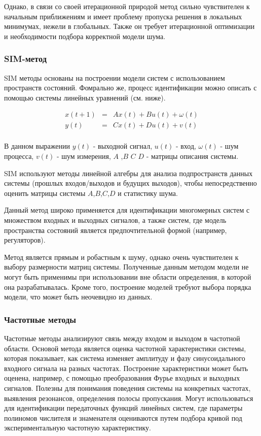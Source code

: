 Однако, в связи со своей итерационной природой метод сильно чувствителен к
начальным приближениям и имеет проблему пропуска решения в локальных минимумах,
нежели в глобальных. Также он требует итерационной оптимизации и необходимости
подбора корректной модели шума.

\subsubsection{SIM-метод}

SIM методы основаны на построении модели систем с использованием пространств
состояний. Фомрально же, процесс идентификации можно описать с помощью системы
линейных уравнений (см. ниже). 

\begin{equation}
  \begin{array}{rcl}
    x(t+1) & = &Ax(t)+Bu(t)+\omega(t) \\
    y(t) &= & Cx(t)+Du(t)+v(t) \\
  \end{array}
    \label{eq:sim_ss}
\end{equation}

В данном выражении $ y(t) $ - выходной сигнал,  $u(t)$ - вход, $\omega(t)$ - шум
процесса, $v(t)$ - шум измерения, $A$ ,$B$ $C$ $D$ - матрицы описания системы.

SIM используют методы линейной алгебры для анализа подпространств данных системы
(прошлых входов/выходов и будущих выходов), чтобы непосредственно оценить
матрицы системы $A$,$B$,$C$,$D$ и статистику шума.

Данный метод широко применяется для идентификации многомерных систем с
множеством входных и выходных сигналов, а также систем, где модель пространства
состояний является предпочтительной формой (например, регуляторов).

Метод является прямым и робастным к шуму, однако очень чувствителен к выбору
размерности матриц системы. Полученные данным методом модели не могут быть
применимы при использовании вне области определения, в которой она
разрабатывалась. Кроме того, построение моделей требуют выбора порядка модели,
что может быть неочевидно из данных.

\subsubsection{Частотные методы}

Частотные методы анализируют связь между входом и выходом в частотной области.
Основой метода является оценка частотной характеристики системы, которая
показывает, как система изменяет амплитуду и фазу синусоидального входного
сигнала на разных частотах. Построение характеристики может быть оценена,
например, с помощью преобразования Фурье входных и выходных сигналов. Полезны
для понимания поведения системы на конкретных частотах, выявления резонансов,
определения полосы пропускания. Могут использоваться для идентификации
передаточных функций линейных систем, где параметры полиномов числителя и
знаменателя оцениваются путем подбора кривой под экспериментальную частотную
характеристику.

